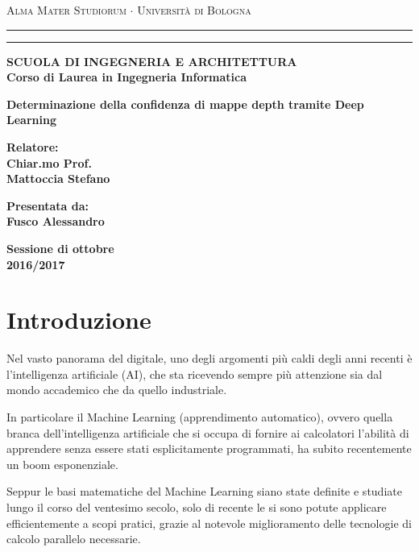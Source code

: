 \documentclass[12pt,a4paper]{report}
\begin{document}
\begin{titlepage}
\begin{center}
    {{\Large{\textsc{
        Alma Mater Studiorum $\cdot$ Università di Bologna
    }}}}
    \rule[0.1cm]{15.8cm}{0.1mm}
    \rule[0.5cm]{15.8cm}{0.6mm}
{\small{\bf 
    SCUOLA DI INGEGNERIA E ARCHITETTURA\\
    Corso di Laurea in Ingegneria Informatica
}}
\end{center}
\vspace{15mm}
\begin{center}
{\LARGE{\bf
    Determinazione della confidenza di mappe depth tramite Deep Learning
}}\\
\vspace{3mm}
\end{center}
\vspace{40mm}
\par
\noindent
\begin{minipage}[t]{0.47\textwidth}
{\large{\bf Relatore:\\
Chiar.mo Prof.\\
Mattoccia Stefano}}
\end{minipage}
\hfill
\begin{minipage}[t]{0.47\textwidth}\raggedleft
{\large{\bf Presentata da:\\
Fusco Alessandro}}
\end{minipage}
\vspace{20mm}
\begin{center}
{\large{\bf 
    Sessione di ottobre\\
    2016/2017
}}
\end{center}
\end{titlepage}


\chapter{Introduzione}
Nel vasto panorama del digitale, uno degli argomenti più caldi degli anni
recenti è l'intelligenza artificiale (AI), che sta ricevendo sempre più
attenzione sia dal mondo accademico che da quello industriale. 

In particolare il Machine Learning (apprendimento automatico), ovvero quella
branca dell'intelligenza artificiale che si occupa di fornire ai calcolatori
l'abilità di apprendere senza essere stati esplicitamente programmati, ha
subito recentemente un boom esponenziale.

Seppur le basi matematiche del Machine Learning siano state definite e studiate
lungo il corso del ventesimo secolo, solo di recente
\cite{krizhevsky2012imagenet} le si sono potute applicare efficientemente a
scopi pratici, grazie al notevole miglioramento delle tecnologie di calcolo
parallelo necessarie.
\end{document}
